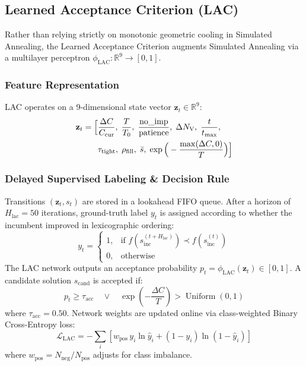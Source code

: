 \subsection{Learned Acceptance Criterion (LAC)}
\label{sec:lac_formulation}

Rather than relying strictly on monotonic geometric cooling in Simulated Annealing, the Learned Acceptance Criterion augments Simulated Annealing via a multilayer perceptron $\phi_{\text{LAC}}: \mathbb{R}^9 \to [0, 1]$.

\subsubsection{Feature Representation}
LAC operates on a 9-dimensional state vector $\mathbf{z}_t \in \mathbb{R}^9$:
\begin{align}
  \mathbf{z}_t = \Big[ 
    &\frac{\Delta C}{C_{\text{cur}}}, \; \frac{T}{T_0}, \; \frac{\text{no\_imp}}{\text{patience}}, \; \Delta {N_\mathrm{V}}, \; \frac{t}{t_{\max}}, \nonumber \\
    &\tau_{\text{tight}}, \; \rho_{\text{fill}}, \; \bar{s}, \; \exp\Big(-\frac{\max(\Delta C, 0)}{T}\Big)
  \Big]
  \label{eq:lac_features}
\end{align}

\subsubsection{Delayed Supervised Labeling \& Decision Rule}
Transitions $(\mathbf{z}_t, s_t)$ are stored in a lookahead FIFO queue. After a horizon of $H_{\text{lac}} = 50$ iterations, ground-truth label $y_t$ is assigned according to whether the incumbent improved in lexicographic ordering:
\begin{equation}
  y_t = \begin{cases} 1, & \text{if } f(s_{\text{inc}}^{(t + H_{\text{lac}})}) \prec f(s_{\text{inc}}^{(t)}) \\ 0, & \text{otherwise} \end{cases}
  \label{eq:lac_label}
\end{equation}
The LAC network outputs an acceptance probability $p_t = \phi_{\text{LAC}}(\mathbf{z}_t) \in [0, 1]$. A candidate solution $s_{\text{cand}}$ is accepted if:
\begin{equation}
  p_t \ge \tau_{\text{acc}} \quad \lor \quad \exp\left(-\frac{\Delta C}{T}\right) > \operatorname{Uniform}(0, 1)
  \label{eq:lac_decision_rule}
\end{equation}
where $\tau_{\text{acc}} = 0.50$. Network weights are updated online via class-weighted Binary Cross-Entropy loss:
\begin{equation}
  \mathcal{L}_{\text{LAC}} = -\sum_{i} \left[ w_{\text{pos}}\,y_i \ln \hat{y}_i + (1 - y_i) \ln(1 - \hat{y}_i) \right]
  \label{eq:lac_loss}
\end{equation}
where $w_{\text{pos}} = N_{\text{neg}} / N_{\text{pos}}$ adjusts for class imbalance.

